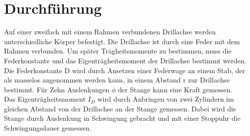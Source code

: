 \section{Durchführung}
\label{sec:Durchführung}
Auf einer zweifach mit einem Rahmen verbundenen Drillachse werden unterschiedliche Körper befestigt.
Die Drillachse ist durch eine Feder mit dem Rahmen verbunden. Um später Trägheitsmomente zu bestimmen,
muss die Federkonstante und das Eigenträgheitsmoment der Drillachse bestimmt werden. \\
Die Federkonstante D wird durch Ansetzen einer Federwage an einem Stab, der als masselos angenommen werden kann, 
in einem Abstand r zur Drillachse bestimmt. Für Zehn Auslenkungen $\phi$ der Stange kann eine Kraft gemessen.\\
Das Eigenträgheitsmoment $I_D$ wird durch Anbringen von zwei Zylindern im gleichen Abstand von der Drillachse
an der Stange gemessen. Dabei wird die Stange durch Auslenkung in Schwingung gebracht und mit einer Stoppuhr
die Schwingungsdauer gemessen.